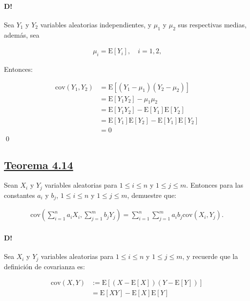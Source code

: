\documentclass[8pt]{article}
\begin{document}
\paragraph*{D!} Sea $Y_1$ y $Y_2$ variables aleatorias independientes, y $\mu_1$ y $\mu_2$ sus respectivas medias, además, sea

\begin{align*}
    \mu_i = \text{E}[Y_i], \quad i = 1, 2\text{,}
\end{align*}

Entonces:

\begin{align*}
    \text{cov}(Y_1, Y_2) &= \text{E}\left[\left(Y_1 - \mu_1\right)\left(Y_2 - \mu_2\right)\right] \\
    &= \text{E}\left[Y_1 Y_2\right] - \mu_1\mu_2 \\
    &= \text{E}\left[Y_1 Y_2\right] - \text{E}\left[Y_1\right]\text{E}\left[Y_2\right] \\
    &= \text{E}\left[Y_1\right]\text{E}\left[Y_2\right] - \text{E}\left[Y_1\right]\text{E}\left[Y_2\right] \\
    &= 0
\end{align*}\qed
 
\subsection*{\hyperref[subsec:teorema414_tag]{Teorema 4.14}}
\label{subsec:teorema414}

Sean $X_i$ y $Y_j$ variables aleatorias para $1 \leq i \leq n$ y $1 \leq j \leq m$. Entonces para las constantes $a_i$ y $b_j$, $1 \leq i \leq n$ y $1 \leq j \leq m$, demuestre que:

\begin{align*}
    \text{cov}\left(\sum_{i=1}^n a_i X_i, \sum_{j=1}^m b_j Y_j\right) = \sum_{i=1}^n \sum_{j=1}^m a_i b_j \text{cov}\left(X_i, Y_j\right).
\end{align*}

\paragraph*{D!} Sea $X_i$ y $Y_j$ variables aleatorias para $1 \leq i \leq n$ y $1 \leq j \leq m$, y recuerde que la definición de covarianza es:

\begin{align*}
    \text{cov}\left(X, Y\right) &:= \text{E}\left[\left(X - \text{E}[X]\right)\left(Y - \text{E}[Y]\right)\right] \\
    &= \text{E}\left[X Y\right] - \text{E}\left[X\right]\text{E}\left[Y\right]
\end{align*}
\end{document}
